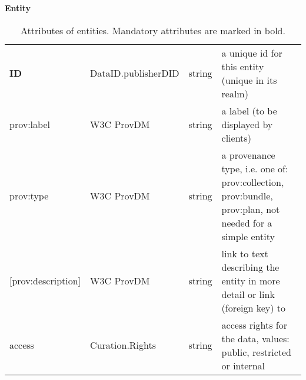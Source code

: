 \begin{table}[h]

\small
{}\textwidth

\textbf{\normalsize Entity}\vspace{0.25em}\\
\begin{tabulary}{1.0\textwidth}{@{}lp{3.5cm}lL@{}}
\toprule
{} &  &  & \\
\midrule
\textbf{ID} & DataID.publisherDID & string & a unique id for this entity (unique in its realm)\\
prov:label        & W3C ProvDM & string & a label (to be displayed by clients)\\
prov:type         & W3C ProvDM  & string & a provenance type, i.e. one of: prov:collection, prov:bundle, prov:plan, not needed for a simple entity\\
{[prov:description]}  & W3C ProvDM  & string & link to text describing the entity in more detail or link (foreign key) to \\
access            & Curation.Rights & string & access rights for the data, values: public, restricted or internal\\
\bottomrule
\end{tabulary}
\caption{Attributes of entities. Mandatory attributes are marked in bold.
}\label{tab:entity-attributes}
\end{table}



